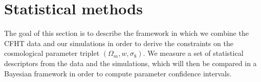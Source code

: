 \documentclass[reprint,aps,prd,superscriptaddress,showkeys,showpacs]{revtex4-1}
\begin{document}


\section{Statistical methods}
The goal of this section is to describe the framework in which we combine the CFHT data and our simulations in order to derive the constraints on the cosmological parameter triplet $(\Omega_m,w,\sigma_8)$. We measure a set of statistical descriptors from the data and the simulations, which will then be compared in a Bayesian framework in order to compute parameter confidence intervals.
\end{document}

